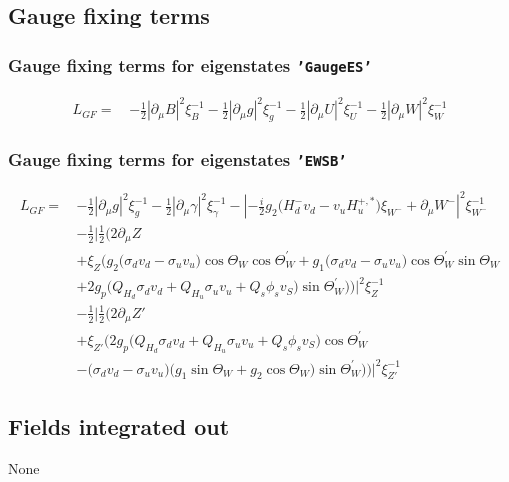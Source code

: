 \subsection{Gauge fixing terms} 
\subsubsection{Gauge fixing terms for eigenstates {\tt 'GaugeES'} } 
\begin{align} 
L_{GF} = \, &-\frac{1}{2} |\partial_{\mu}B|^2 \xi_{B}^{-1}  -\frac{1}{2} |\partial_{\mu}g|^2 \xi_{g}^{-1}  -\frac{1}{2} |\partial_{\mu}U|^2 \xi_{U}^{-1}  -\frac{1}{2} |\partial_{\mu}W|^2 \xi_{W}^{-1} 
\end{align} 
\subsubsection{Gauge fixing terms for eigenstates {\tt 'EWSB'} } 
\begin{align} 
L_{GF} = \, &-\frac{1}{2} |\partial_{\mu}g|^2 \xi_{g}^{-1} -\frac{1}{2} |\partial_{\mu}\gamma|^2 \xi_{\gamma}^{-1} - |-\frac{i}{2} g_2 \Big(H_d^- v_d  - v_u H_u^{+,*} \Big)\xi_{W^-}  + \partial_{\mu}W^-|^2 \xi_{W^-}^{-1} \nonumber \\ 
 &-\frac{1}{2} |\frac{1}{2} \Big(2 \partial_{\mu}Z \nonumber \\ 
 &+\xi_{Z} \Big(g_2 \Big(\sigma_{d} v_d  - \sigma_{u} v_u \Big)\cos\Theta_W  \cos\Theta_W^{\prime}  +g_1 \Big(\sigma_{d} v_d  - \sigma_{u} v_u \Big)\cos\Theta_W^{\prime}  \sin\Theta_W  \nonumber \\ 
 &+2 g_p \Big(Q_{H_d} \sigma_{d} v_d  + Q_{H_u} \sigma_{u} v_u  + Q_s \phi_s v_S \Big)\sin\Theta_W^{\prime}  \Big)\Big)|^2 \xi_{Z}^{-1} \nonumber \\ 
 &-\frac{1}{2} |\frac{1}{2} \Big(2 \partial_{\mu}{Z'} \nonumber \\ 
 &+\xi_{{Z'}} \Big(2 g_p \Big(Q_{H_d} \sigma_{d} v_d  + Q_{H_u} \sigma_{u} v_u  + Q_s \phi_s v_S \Big)\cos\Theta_W^{\prime}  \nonumber \\ 
 &- \Big(\sigma_{d} v_d  - \sigma_{u} v_u \Big)\Big(g_1 \sin\Theta_W   + g_2 \cos\Theta_W  \Big)\sin\Theta_W^{\prime}  \Big)\Big)|^2 \xi_{{Z'}}^{-1} 
\end{align} 
\subsection{Fields integrated out} 
None 
